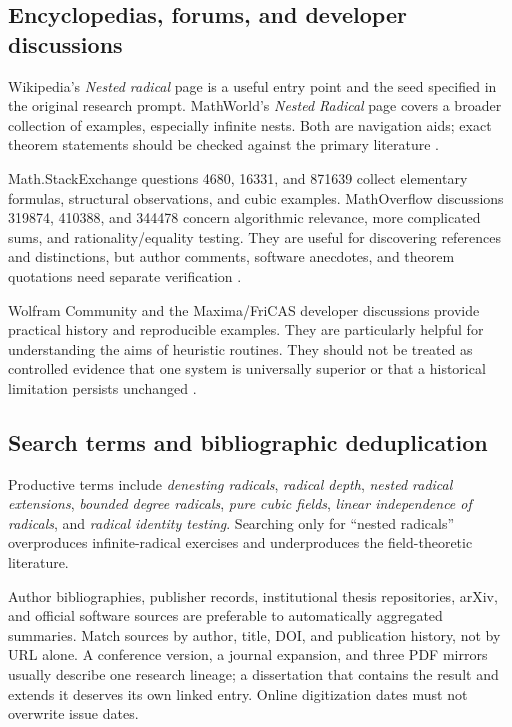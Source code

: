\documentclass[11pt,oneside]{article}
\numberwithin{equation}{section}
\theoremstyle{definition}
\theoremstyle{remark}
\begin{document}
\subsection{Encyclopedias, forums, and developer discussions}
Wikipedia's \emph{Nested radical} page is a useful entry point and the seed specified in the original research prompt. MathWorld's \emph{Nested Radical} page covers a broader collection of examples, especially infinite nests. Both are navigation aids; exact theorem statements should be checked against the primary literature \cite{wikipedia,mathworld}.

Math.StackExchange questions 4680, 16331, and 871639 collect elementary formulas, structural observations, and cubic examples. MathOverflow discussions 319874, 410388, and 344478 concern algorithmic relevance, more complicated sums, and rationality/equality testing. They are useful for discovering references and distinctions, but author comments, software anecdotes, and theorem quotations need separate verification \cite{mse,mo}.

Wolfram Community and the Maxima/FriCAS developer discussions provide practical history and reproducible examples. They are particularly helpful for understanding the aims of heuristic routines. They should not be treated as controlled evidence that one system is universally superior or that a historical limitation persists unchanged \cite{wolframcommunity,maxima,fricas}.

\subsection{Search terms and bibliographic deduplication}
Productive terms include \emph{denesting radicals}, \emph{radical depth}, \emph{nested radical extensions}, \emph{bounded degree radicals}, \emph{pure cubic fields}, \emph{linear independence of radicals}, and \emph{radical identity testing}. Searching only for ``nested radicals'' overproduces infinite-radical exercises and underproduces the field-theoretic literature.

Author bibliographies, publisher records, institutional thesis repositories, arXiv, and official software sources are preferable to automatically aggregated summaries. Match sources by author, title, DOI, and publication history, not by URL alone. A conference version, a journal expansion, and three PDF mirrors usually describe one research lineage; a dissertation that contains the result and extends it deserves its own linked entry. Online digitization dates must not overwrite issue dates.
\end{document}
